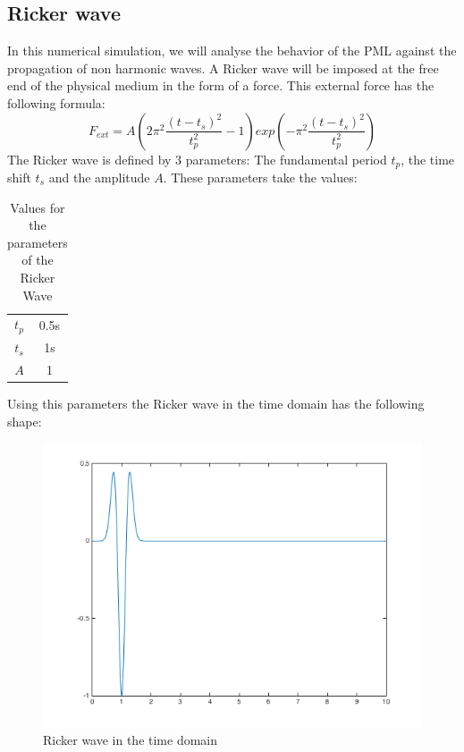 \subsection{Ricker wave}
In this numerical simulation, we will analyse the behavior of the PML against the propagation of non harmonic waves. A Ricker wave will be imposed at the free end of the physical medium in the form of a force. This external force has the following formula:
\begin{equation}
    F_{ext} = A\left( 2 \pi^2\frac{(t-t_s)^2}{t^2_p}-1\right) exp\left( -\pi^2\frac{(t-t_s)^2}{t^2_p}\right)
\end{equation}
The Ricker wave is defined by 3 parameters: The fundamental period $t_p$, the time shift $t_s$ and the amplitude $A$. These parameters take the values:
\begin{table}[H]
    \centering
    \begin{tabular}{c|c}
         $t_p$ & 0.5s \\
         $t_s $& 1s \\
         $A$ & 1
    \end{tabular}
    \caption{Values for the parameters of the Ricker Wave}
    \label{tab:param_Ricker}
\end{table}
Using this parameters the Ricker wave in the time domain has the following shape:
\begin{figure}[H]
    \centering
    \includegraphics[scale=0.5]{images/ricker.png}
    \caption{Ricker wave in the time domain}
    \label{fig:ricker}
\end{figure}
